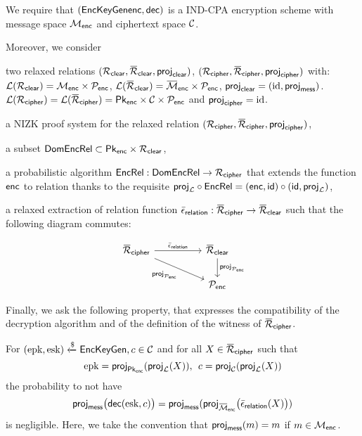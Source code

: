 	We require that $(\mathsf{EncKeyGen} \textsf{enc}, \textsf{dec})$ is a IND-CPA 
encryption scheme with message space $\mathcal{M}_{\mathsf{enc}}$ and ciphertext space 
$\mathcal{C}$.

Moreover, we consider 
	\begin{compactitem}
		\item two relaxed relations $(\relationclear, \barrelationclear,
\projclear)$, $(\relationcipher, \barrelationcipher,\allowbreak \projcipher)$ 
			with:\\
		$\mathcal{L}(\mathcal{R}_{\mathsf{clear}}) = \mathcal{M}_{\mathsf{enc}} \times \mathcal{P}_{\mathsf{enc}}$,
		$\Language{\barrelationclear} = \SetRelMessEnc \times \SetPubEnc$, $\projclear =
	(\idfunction, \projenc)$. 
		$\Language{\relationcipher} = \Language{\barrelationcipher} = \SetPublicKeysEnc \times \SetCipherEnc \times
	\SetPubEnc$ and $\projcipher = \idfunction$.

	\item a NIZK proof system for the relaxed relation 
$(\relationcipher, \barrelationcipher,\allowbreak \projcipher)$,


 \item a subset $\mathsf{DomEncRel} \subset \mathsf{Pk}_{\mathsf{enc}} \times \mathcal{R}_{\mathsf{clear}}$,

\item a probabilistic algorithm $\mathsf{EncRel}: \mathsf{DomEncRel} \rightarrow 
\mathcal{R}_{\mathsf{cipher}}$ that extends the function $\textsf{enc}$ to relation thanks to 
the requisite $\projL \circ \EncRel = (\Enc, \id) \circ (\id, \projL)$,

\item a relaxed extraction of relation function $\barextractionrelation 
:\barrelationcipher \rightarrow \barrelationclear$ such that the 
following diagram commutes:

\[ \begin{tikzcd}
	\barrelationcipher \arrow{rr}{\barextractionrelation}
	\arrow[swap]{drr}{\proj_{\SetPubEnc}}
	 &&\barrelationclear \arrow{d}{\proj_{\SetPubEnc}} \\
	&& \SetPubEnc\end{tikzcd} \]
\end{compactitem}
	Finally, we ask the following property, that expresses
	the compatibility of the decryption algorithm and of the definition of the witness of
	$\barrelationcipher$.
	\begin{compactitem}
	\item For $(\text{epk}, \text{esk}) \xleftarrow{\$} \mathsf{EncKeyGen}, c \in \mathcal{C}$ and for all $X \in \barrelationcipher$ such
		that \[\epk = \proj[\SetPublicKeysEnc](\projL(X)),\:\: \cipher = \proj_{\SetCipherEnc}(\projL(X))\]
	the probability to not have
	\[ \projenc\big(\Dec(\esk, \cipher)\big) = \projenc(\proj_{\SetRelMessEnc}\big(\barextractionrelation(X)\big))\]
	is negligible. Here, we take the convention that $\projenc(m) = m$ if $m \in \mathcal{M}_{\mathsf{enc}}$.
\end{compactitem}



